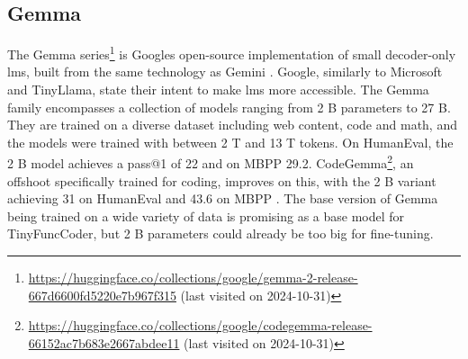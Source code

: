 \subsection{Gemma}
\label{sec:gemma}

The Gemma series\footnote{\url{https://huggingface.co/collections/google/gemma-2-release-667d6600fd5220e7b967f315} (last visited on 2024-10-31)} is Googles open-source implementation of small decoder-only \acp{lm}, built from the same technology as Gemini \cite{GemmaTeam.2024}.
Google, similarly to Microsoft and TinyLlama, state their intent to make \acp{lm} more accessible.
The Gemma family encompasses a collection of models ranging from 2 B parameters to 27 B.
They are trained on a diverse dataset including web content, code and math, and the models were trained with between 2 T and 13 T tokens.
On HumanEval, the 2 B model achieves a pass@1 of 22 and on MBPP 29.2.
CodeGemma\footnote{\url{https://huggingface.co/collections/google/codegemma-release-66152ac7b683e2667abdee11} (last visited on 2024-10-31)}, an offshoot specifically trained for coding, improves on this, with the 2 B variant achieving 31 on HumanEval and 43.6 on MBPP \cite{CodeGemmaTeam.2024}.
The base version of Gemma being trained on a wide variety of data is promising as a base model for TinyFuncCoder, but 2 B parameters could already be too big for fine-tuning.

